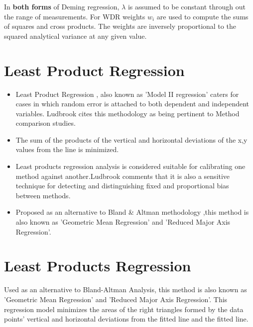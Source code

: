 \documentclass[12pt, a4paper]{report}
\theoremstyle{plain}
\theoremstyle{definition}
\theoremstyle{remark}
\begin{document}
In \textbf{both forms} of Deming regression, $\lambda$ is assumed to be constant through out the range of measurements. For WDR weights $w_{i}$ are used to compute the sums of squares and cross products. The weights are inversely proportional to the squared analytical variance at any given value.



\section{Least Product Regression}

\begin{itemize}
	\item Least Product Regression , also known as 'Model II regression'
	caters for cases in which random error is attached to both
	dependent and independent variables. Ludbrook cites this
	methodology as being pertinent to Method comparison studies.
	
	\item 
	The sum of the products of the vertical and horizontal deviations
	of the x,y values from the line is minimized.
	
	\item 
	Least products regression analysis is considered suitable for
	calibrating one method against another.Ludbrook comments that it
	is also a sensitive technique for detecting and distinguishing
	fixed and proportional bias between methods.
	
	\item 
	Proposed as an alternative to Bland \& Altman methodology ,this
	method is also known as 'Geometric Mean Regression' and 'Reduced
	Major Axis Regression'.
\end{itemize}





\section{Least Products Regression}
Used as an alternative to Bland-Altman Analysis, this method is also known as 'Geometric Mean Regression' and 'Reduced Major Axis Regression'. This regression model minimizes the areas of the right triangles formed by the data points' vertical and horizontal deviations from the fitted line and the fitted line.
\end{document}
